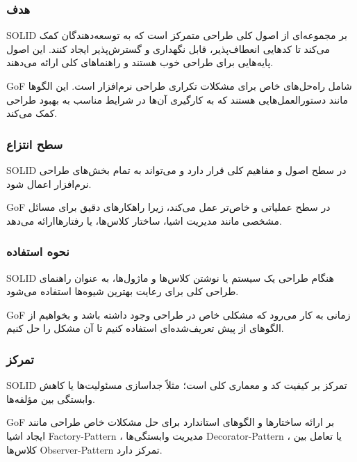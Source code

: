 \subsubsection*{هدف}
SOLID بر مجموعه‌ای از اصول کلی طراحی متمرکز است که به توسعه‌دهندگان کمک می‌کند تا کدهایی انعطاف‌پذیر، قابل نگهداری و گسترش‌پذیر ایجاد کنند. این اصول پایه‌هایی برای طراحی خوب هستند و راهنماهای کلی ارائه می‌دهند.

GoF شامل راه‌حل‌های خاص برای مشکلات تکراری طراحی نرم‌افزار است. این الگوها مانند دستورالعمل‌هایی هستند که به کارگیری آن‌ها در شرایط مناسب به بهبود طراحی کمک می‌کند.

\subsubsection*{سطح انتزاع}
SOLID در سطح اصول و مفاهیم کلی قرار دارد و می‌تواند به تمام بخش‌های طراحی نرم‌افزار اعمال شود.

GoF در سطح عملیاتی و خاص‌تر عمل می‌کند، زیرا راهکارهای دقیق برای مسائل مشخصی مانند مدیریت اشیا، ساختار کلاس‌ها، یا رفتارهاارائه می‌دهد.

\subsubsection*{نحوه استفاده}
SOLID هنگام طراحی یک سیستم یا نوشتن کلاس‌ها و ماژول‌ها، به عنوان راهنمای طراحی کلی برای رعایت بهترین شیوه‌ها استفاده می‌شود.

GoF زمانی به کار می‌رود که مشکلی خاص در طراحی وجود داشته باشد و بخواهیم از الگوهای از پیش تعریف‌شده‌ای استفاده کنیم تا آن مشکل را حل کنیم.

\subsubsection*{تمرکز}
SOLID تمرکز بر کیفیت کد و معماری کلی است؛ مثلاً جداسازی مسئولیت‌ها یا کاهش وابستگی بین مؤلفه‌ها.

GoF بر ارائه ساختارها و الگوهای استاندارد برای حل مشکلات خاص طراحی مانند ایجاد اشیا Factory-Pattern ، مدیریت وابستگی‌ها  Decorator-Pattern ، یا تعامل بین کلاس‌ها Observer-Pattern تمرکز دارد.